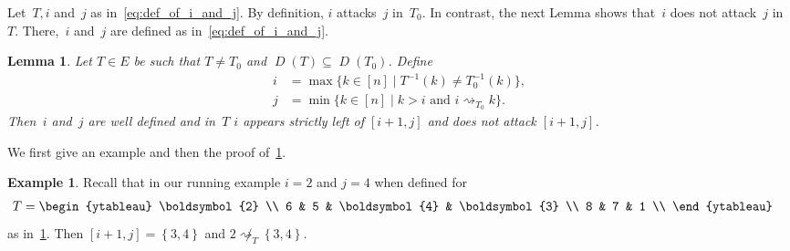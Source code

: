 \documentclass[10pt]{amsart}
\theoremstyle{plain}
\theoremstyle{plain}
\newtheorem{lemma}[lemma]{Lemma}
\theoremstyle{plain}
\theoremstyle{plain}
\theoremstyle{plain}
\theoremstyle{definition}
\theoremstyle{definition}
\newtheorem{exam}[exam]{Example}
\newcommand{\bs}[1]{\boldsymbol{#1} }
\newcommand{\D}{\operatorname{\mathit{D}}}
\newcommand{\set}[1]{\left\{ #1 \right\}}
\newcommand{\att}{\rightsquigarrow}
\begin{document}
Let~$T,i$ and~$j$ as in~\eqref{eq:def_of_i_and_j}.
By definition, $i$ attacks~$j$ in~$T_0$.
In contrast, the next Lemma shows that~$i$ does not attack~$j$ in~$T$.
There,~$i$ and~$j$ are defined as in~\eqref{eq:def_of_i_and_j}.

\begin{lemma}
	\label{thm:position_of_entries_smaller_as_attacked_entry_in_T}
	Let $T\in E$ be such that $T\neq T_0$ and $\D(T) \subseteq \D(T_0)$. Define
	\begin{align*}
		i &= \max \big\{k \in [n] \mid T^{-1}(k) \neq T^{-1}_0(k)\big\}, \\
		j &= \min \big\{k \in [n] \mid k>i \text{ and } i\att_{T_0} k\big\}.
	\end{align*}
	Then~$i$ and~$j$ are well defined and in~$T$ $i$ appears strictly left of $[i+1,j]$ and does not attack $[i+1,j]$. 
\end{lemma}

We first give an example and then the proof of~\cref{thm:position_of_entries_smaller_as_attacked_entry_in_T}\!.

\begin{samepage}
\begin{exam} Recall that in our running example $i=2$ and $j=4$ when defined for
	\begin{align*}
		T &= 
		\begin{ytableau} 
			\bs 2 \\ 
			6 & 5 & \bs4 & \bs3 \\ 
			8 & 7 & 1 \\ 
		\end{ytableau}
	\end{align*} 
	 as in~\cref{thm:position_of_entries_smaller_as_attacked_entry_in_T}. Then
 $[i+1,j] = \set{3,4}$ and $2\not \att_T \set{3,4}$.
\end{exam}
\end{samepage}
\end{document}
